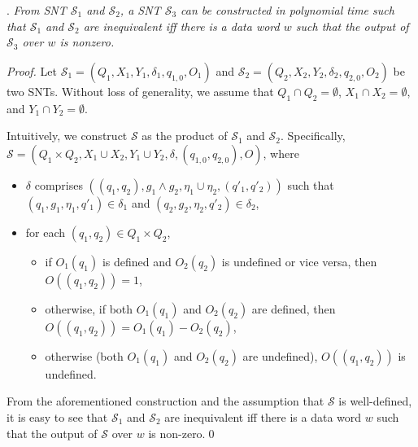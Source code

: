\documentclass[runningheads,a4paper]{llncs}
\def\Ss{{\mathcal{S} }}
\begin{document}
\begin{appendix}
.
\emph{From SNT $\Ss_1$ and $\Ss_2$, a SNT $\Ss_3$ can be constructed in polynomial time such that $\Ss_1$ and $\Ss_2$ are  inequivalent iff there is a data word $w$ such that the output of $\Ss_3$ over $w$ is nonzero.}

\begin{proof}
Let $\Ss_1 = (Q_1,X_1,Y_1,\delta_1,q_{1,0}, O_1)$ and  $\Ss_2 = (Q_2,X_2,Y_2,\delta_2,q_{2,0}, O_2)$ be two SNTs. Without loss of generality, we assume that $Q_1 \cap Q_2 = \emptyset$, $X_1 \cap X_2 = \emptyset$, and $Y_1 \cap Y_2 = \emptyset$. 

Intuitively, we construct $\Ss$ as the product of $\Ss_1$ and $\Ss_2$. Specifically, $\Ss=(Q_1 \times Q_2, X_1 \cup X_2, Y_1 \cup Y_2, \delta, (q_{1,0},q_{2,0}), O)$, where
\begin{itemize}
\item $\delta$ comprises $((q_1,q_2), g_1 \wedge g_2, \eta_1 \cup \eta_2, (q'_1,q'_2))$ such that $(q_1,g_1,\eta_1,q'_1) \in \delta_1$ and $(q_2,g_2,\eta_2,q'_2) \in \delta_2$,
%
\item for each $(q_1,q_2) \in Q_1 \times Q_2$, 
\begin{itemize}
\item if $O_1(q_1)$ is defined and $O_2(q_2)$ is undefined or vice versa, then $O((q_1,q_2))=1$, 
%
\item otherwise, if both $O_1(q_1)$ and $O_2(q_2)$ are defined, then $O((q_1,q_2))=O_1(q_1) - O_2(q_2)$, 
%
\item otherwise (both $O_1(q_1)$ and $O_2(q_2)$ are undefined), $O((q_1,q_2))$ is undefined. 
\end{itemize}
\end{itemize}
From the aforementioned construction and the assumption that $\Ss$ is well-defined, it is easy to see that $\Ss_1$ and $\Ss_2$ are  inequivalent iff there is a data word $w$ such that the output of $\Ss$ over $w$ is non-zero.\qed
\end{proof}


\end{appendix}
\end{document}

